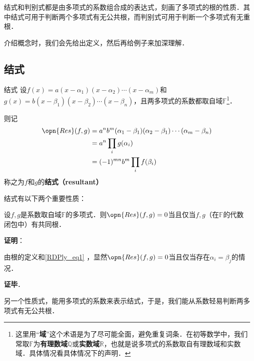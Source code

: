 

结式和判别式都是由多项式的系数组合成的表达式，刻画了多项式的根的性质．其中结式可用于判断两个多项式有无公共根，而判别式可用于判断一个多项式有无重根．

介绍概念时，我们会先给出定义，然后再给例子来加深理解．

\subsection{结式}

\begin{definition}{结式}
设$f(x)=a(x-\alpha_1)(x-\alpha_2)\cdots(x-\alpha_m)$和$g(x)=b(x-\beta_1)(x-\beta_2)\cdots(x-\beta_n)$，且两多项式的系数都取自域$\mathbb{F}$\footnote{这里用“\textbf{域}”这个术语是为了尽可能全面，避免重复词条．在初等数学中，我们常取$\mathbb{F}$为\textbf{有理数域}$\mathbb{Q}$或\textbf{实数域}$\mathbb{R}$，也就是说多项式的系数取自有理数域和实数域．具体情况看具体情况下的声明．}．

则记
\begin{equation}\label{RDPly_eq1}
\begin{aligned}
\opn{Res}(f, g)&=a^nb^m(\alpha_1-\beta_1)(\alpha_2-\beta_1)\cdots(\alpha_m-\beta_n)\\
&=a^n\prod_{i} g(\alpha_i)\\
&=(-1)^{mn}b^m\prod_{i} f(\beta_i)
\end{aligned}
\end{equation}
称之为$f$和$g$的\textbf{结式（resultant）}

\end{definition}

结式有以下两个重要性质：

\begin{theorem}{}
设$f, g$是系数取自域$\mathbb{F}$的多项式．则$\opn{Res}(f, g)=0$当且仅当$f, g$（在$\mathbb{F}$的代数闭包中）有共同根．
\end{theorem}

\textbf{证明}：

由根的定义和\autoref{RDPly_eq1} ，显然$\opn{Res}(f, g)=0$当且仅当存在$\alpha_i=\beta_j$的情况．

\textbf{证毕}．


另一个性质式，能用多项式的系数来表示结式，于是，我们能从系数轻易判断两多项式有无公共根．



